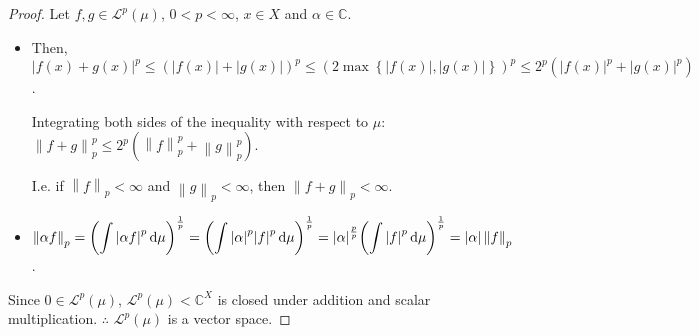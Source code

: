 \begin{frame}
	\begin{proof}
		Let $f,g\in\mathcal{L}^{p}\left(\mu\right)$, $0<p<\infty$,
		$x\in X$ and $\alpha\in\mathds{C}$.
		\begin{itemize}
			\item

			      Then,
			      \begin{math}
				      {\left|f\left(x\right)+g\left(x\right)\right|}^{p}
				      \leq
				      {
					      \left(
					      \left|f\left(x\right)\right|+
					      \left|g\left(x\right)\right|
					      \right)
				      }^{p}
				      \leq
				      {\left(
					      2\max
					      \left\{
					      \left|f\left(x\right)\right|,
					      \left|g\left(x\right)\right|
					      \right\}
					      \right)
				      }^{p}
				      \leq
				      2^{p}
				      \left(
				      {\left|f\left(x\right)\right|}^{p}+
				      {\left|g\left(x\right)\right|}^{p}
				      \right)
			      \end{math}.

			      Integrating both sides of the inequality with respect to
			      $\mu$:
			      \begin{math}
				      {\left\|f+g\right\|}^{p}_{p}
				      \leq
				      2^{p}
				      \left(
				      {\left\|f\right\|}^{p}_{p}+{\left\|g\right\|}^{p}_{p}
				      \right)
			      \end{math}.

			      I.e. if ${\left\|f\right\|}_{p}<\infty$ and
			      ${\left\|g\right\|}_{p}<\infty$, then
			      ${\left\|f+g\right\|}_{p}<\infty$.

			\item

			      \begin{math}
				      \displaystyle
				      {\left\|\alpha f\right\|}_{p}=
				      {
				      \left(
				      \int
				      {\left|\alpha f\right|}^{p}\dl\mu
				      \right)
				      }^{\frac{1}{p}}
					      =
					      {
						      \left(
						      \int
						      {\left|\alpha\right|}^{p}
						      {\left|f\right|}^{p}\dl\mu
						      \right)
					      }^{\frac{1}{p}}
					      =
					      {\left|\alpha\right|}^{\frac{p}{p}}
					      {
						      \left(
						      \int
						      {\left|f\right|}^{p}\dl\mu
						      \right)
					      }^{\frac{1}{p}}
				      =
				      \left|\alpha\right|
				      {\left\|f\right\|}_{p}
			      \end{math}.
		\end{itemize}

		Since $0\in\mathcal{L}^{p}\left(\mu\right)$,
		\begin{math}
			\mathcal{L}^{p}\left(\mu\right)<
			\mathds{C}^{X}
		\end{math}
		is closed under addition and scalar multiplication.
		$\therefore$
		\alert{$\mathcal{L}^{p}\left(\mu\right)$ is a vector space}.
	\end{proof}
\end{frame}

